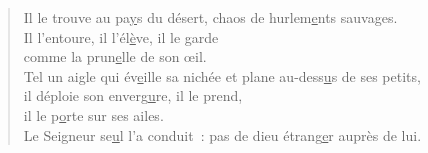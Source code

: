 \begin{verse}
Il le trouve au pa\underline{y}s du désert,\psalmstar
chaos de hurlem\underline{e}nts sauvages.\\
Il l'entoure, il l'él\underline{è}ve, il le garde\\
comme la prun\underline{e}lle de son œil.\\

Tel un aigle qui év\underline{e}ille sa nichée\psalmstar
et plane au-dess\underline{u}s de ses petits,\\
il déploie son enverg\underline{u}re, il le prend,\\
il le p\underline{o}rte sur ses ailes.\\
Le Seigneur se\underline{u}l l'a conduit :\psalmstar
pas de dieu étrang\underline{e}r auprès de lui.
\end{verse}

